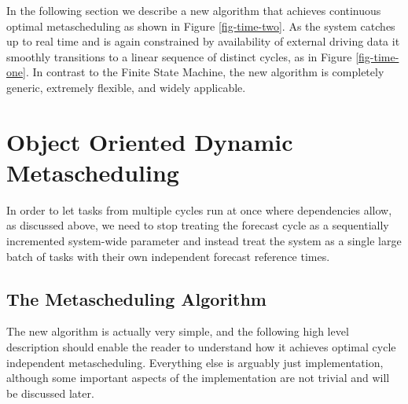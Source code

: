\documentclass[11pt,a4paper]{article}
\begin{document}
In the following section we describe a new algorithm that achieves
continuous optimal metascheduling as shown in Figure \ref{fig-time-two}.
As the system catches up to real time and is again constrained by
availability of external driving data it smoothly transitions to a
linear sequence of distinct cycles, as in Figure \ref{fig-time-one}. In
contrast to the Finite State Machine, the new algorithm is completely
generic, extremely flexible, and widely applicable.  


\section{Object Oriented Dynamic Metascheduling}

In order to let tasks from multiple cycles run at once where
dependencies allow, as discussed above, we need to stop treating the
forecast cycle as a sequentially incremented system-wide
parameter and instead treat the system as a single large batch of tasks
with their own independent forecast reference times. 

\subsection{The Metascheduling Algorithm}

The new algorithm is actually very simple, and the following high level
description should enable the reader to understand how it achieves
optimal cycle independent metascheduling. Everything else is arguably
just implementation, although some important aspects of the
implementation are not trivial and will be discussed later.
\end{document}
